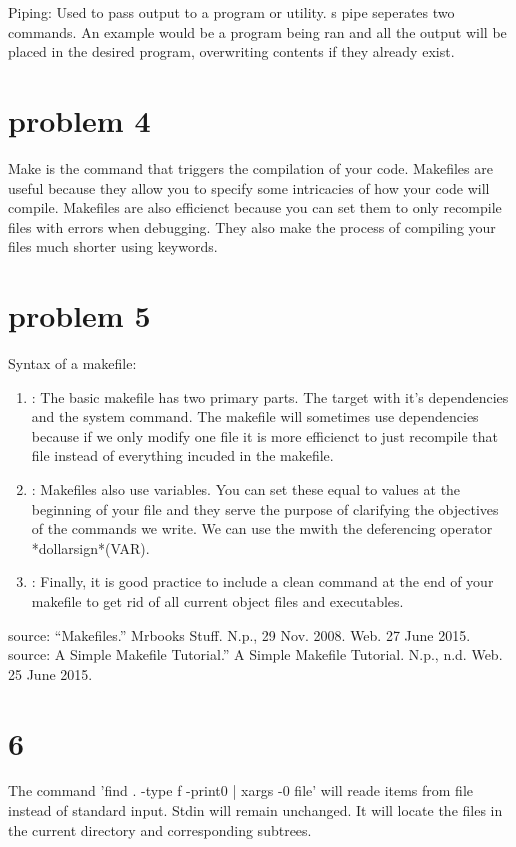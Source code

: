\documentclass[letterpaper,10pt,titlepage]{article}
\begin{document}
Piping: Used to pass output to a program or utility. s pipe seperates two commands.  An example would be a program being ran and all the output will be placed in the desired program, overwriting contents if they already exist.

\section{problem 4}
Make is the command that triggers the compilation of your code. Makefiles are useful because they allow you to specify some intricacies of how your code will compile. Makefiles are also efficienct because you can set them to only recompile files with errors when debugging. They also make the process of compiling your files much shorter using keywords.

\section{problem 5}
Syntax of a makefile:

\begin{enumerate}
\item:   The basic makefile has two primary parts. The target with it's dependencies and the system command. The makefile will sometimes use dependencies because if we only modify one file it is more efficienct to just recompile that file instead of everything incuded in the makefile.

\item: Makefiles also use variables. You can set these equal to values at the beginning of your file and they serve the purpose of clarifying the objectives of the commands we write. We can use the mwith the deferencing operator *dollarsign*(VAR).

\item: Finally, it is good practice to include a clean command at the end of your makefile to get rid of all current object files and executables. 
\end{enumerate}

source: ``Makefiles.'' Mrbooks Stuff. N.p., 29 Nov. 2008. Web. 27 June 2015.
source: A Simple Makefile Tutorial.'' A Simple Makefile Tutorial. N.p., n.d. Web. 25 June 2015. 

\section{6}
The command 'find . -type f -print0 | xargs -0  file' will reade items from file instead of standard input. Stdin will remain unchanged. It will locate the files in the current directory and corresponding subtrees.
\end{document}

